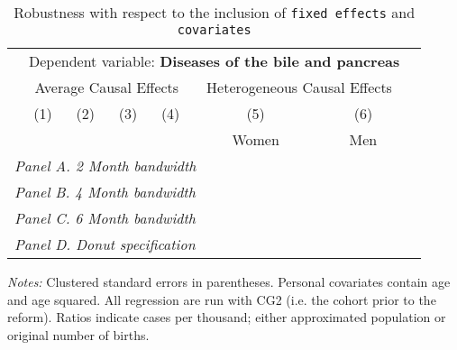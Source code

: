  \begin{table}[H] \begin{threeparttable} \centering \caption{Robustness with respect to the inclusion of \texttt{fixed effects} and \texttt{covariates}} {\def\sym#1{\ifmmode^{#1}\else\(^{#1}\)\fi} \begin{tabular}{l*{7}{c}} \toprule & \multicolumn{6}{c}{Dependent variable: \textbf{Diseases of the bile and pancreas}} \\ \cmidrule(lr){2-7}
            &\multicolumn{4}{c}{Average Causal Effects}         &\multicolumn{2}{c}{Heterogeneous Causal Effects}\\\cmidrule(lr){2-5}\cmidrule(lr){6-7}
            &\multicolumn{1}{c}{(1)}&\multicolumn{1}{c}{(2)}&\multicolumn{1}{c}{(3)}&\multicolumn{1}{c}{(4)}&\multicolumn{1}{c}{(5)}&\multicolumn{1}{c}{(6)}\\
            &\multicolumn{1}{c}{}&\multicolumn{1}{c}{}&\multicolumn{1}{c}{}&\multicolumn{1}{c}{}&\multicolumn{1}{c}{Women}&\multicolumn{1}{c}{Men}\\
\midrule
 \multicolumn{7}{l}{\emph{Panel A. 2 Month bandwidth}} \\    \midrule\multicolumn{7}{l}{\emph{Panel B. 4 Month bandwidth}} \\    \midrule\multicolumn{7}{l}{\emph{Panel C. 6 Month bandwidth}} \\    \midrule\multicolumn{7}{l}{\emph{Panel D. Donut specification}} \\    \midrule  
\bottomrule \end{tabular} } \begin{tablenotes} \item \scriptsize \emph{Notes:} Clustered standard errors in parentheses. Personal covariates contain age and age squared. All regression are run with CG2 (i.e. the cohort prior to the reform). Ratios indicate cases per thousand; either approximated population or original number of births. \end{tablenotes} \end{threeparttable} \end{table} 
